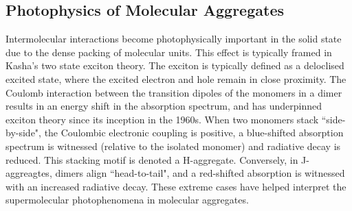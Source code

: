 \subsection{Photophysics of Molecular Aggregates}\label{section: lom intermolecular-interactions}
Intermolecular interactions become photophysically important in the solid state due to the dense packing of molecular units. This effect is typically framed in Kasha's two state exciton theory.\cite{Gierschner2009,Gierschner2013,Gierschner2013a,Hestand2017,Shi2017} The exciton is typically defined as a deloclised excited state, where the excited electron and hole remain in close proximity. The Coulomb interaction between the transition dipoles of the monomers in a dimer results in an energy shift in the absorption spectrum, and has underpinned exciton theory since its inception in the 1960s.\cite{Kasha1965a} When two monomers stack ``side-by-side", the Coulombic electronic coupling is positive, a blue-shifted absorption spectrum is witnessed (relative to the isolated monomer) and radiative decay is reduced. This stacking motif is denoted a H-aggregate. Conversely, in J-aggreagtes, dimers align ``head-to-tail", and a red-shifted absorption is witnessed with an increased radiative decay. These extreme cases have helped interpret the supermolecular photophenomena in molecular aggregates.

